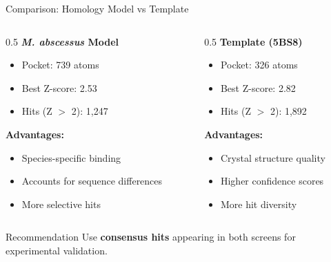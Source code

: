 \documentclass[aspectratio=169,xcolor=table]{beamer}
\begin{document}
\begin{frame}{Comparison: Homology Model vs Template}
\begin{columns}
\begin{column}{0.5\textwidth}
\centering
\textbf{\textit{M. abscessus} Model}
\begin{itemize}\setlength{\itemsep}{0pt}
    \item Pocket: 739 atoms
    \item Best Z-score: 2.53
    \item Hits (Z $>$ 2): 1,247
\end{itemize}

\textbf{Advantages:}
\begin{itemize}\setlength{\itemsep}{0pt}
    \item Species-specific binding
    \item Accounts for sequence differences
    \item More selective hits
\end{itemize}
\end{column}

\begin{column}{0.5\textwidth}
\centering
\textbf{Template (5BS8)}
\begin{itemize}\setlength{\itemsep}{0pt}
    \item Pocket: 326 atoms
    \item Best Z-score: 2.82
    \item Hits (Z $>$ 2): 1,892
\end{itemize}

\textbf{Advantages:}
\begin{itemize}\setlength{\itemsep}{0pt}
    \item Crystal structure quality
    \item Higher confidence scores
    \item More hit diversity
\end{itemize}
\end{column}
\end{columns}

\vspace{0.3cm}
\begin{block}{Recommendation}
Use \textbf{consensus hits} appearing in both screens for experimental validation.
\end{block}
\end{frame}
\end{document}
